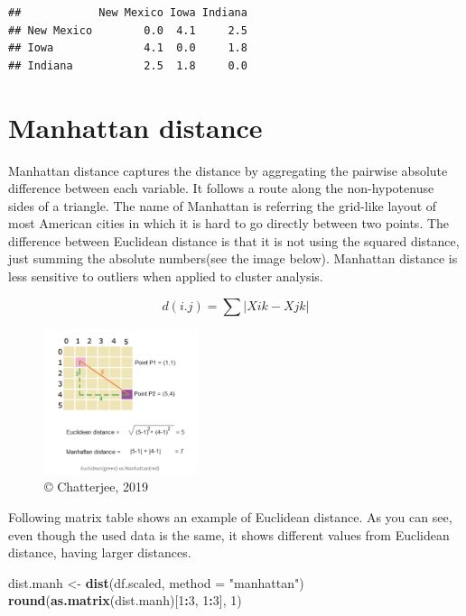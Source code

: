 \documentclass[]{book}
\newenvironment{Shaded}{\begin{snugshade}}{\end{snugshade}}
\newcommand{\DataTypeTok}[1]{\textcolor[rgb]{0.13,0.29,0.53}{#1}}
\newcommand{\DecValTok}[1]{\textcolor[rgb]{0.00,0.00,0.81}{#1}}
\newcommand{\KeywordTok}[1]{\textcolor[rgb]{0.13,0.29,0.53}{\textbf{#1}}}
\newcommand{\NormalTok}[1]{#1}
\newcommand{\OperatorTok}[1]{\textcolor[rgb]{0.81,0.36,0.00}{\textbf{#1}}}
\newcommand{\StringTok}[1]{\textcolor[rgb]{0.31,0.60,0.02}{#1}}
\begin{document}
\begin{verbatim}
##            New Mexico Iowa Indiana
## New Mexico        0.0  4.1     2.5
## Iowa              4.1  0.0     1.8
## Indiana           2.5  1.8     0.0
\end{verbatim}

\hypertarget{manhattan-distance}{%
\section{Manhattan distance}\label{manhattan-distance}}

Manhattan distance captures the distance by aggregating the pairwise absolute difference between each variable. It follows a route along the non-hypotenuse sides of a triangle. The name of Manhattan is referring the grid-like layout of most American cities in which it is hard to go directly between two points. The difference between Euclidean distance is that it is not using the squared distance, just summing the absolute numbers(see the image below). Manhattan distance is less sensitive to outliers when applied to cluster analysis.

\[
d(i.j) = \sum|Xik-Xjk|
\]

\begin{figure}
\centering
\includegraphics[width=0.4\textwidth,height=\textheight]{Manhattan.png}
\caption{© Chatterjee, 2019}
\end{figure}

Following matrix table shows an example of Euclidean distance. As you can see, even though the used data is the same, it shows different values from Euclidean distance, having larger distances.

\begin{Shaded}
\begin{Highlighting}[]
\NormalTok{dist.manh <-}\StringTok{ }\KeywordTok{dist}\NormalTok{(df.scaled, }\DataTypeTok{method =} \StringTok{"manhattan"}\NormalTok{)}
\KeywordTok{round}\NormalTok{(}\KeywordTok{as.matrix}\NormalTok{(dist.manh)[}\DecValTok{1}\OperatorTok{:}\DecValTok{3}\NormalTok{, }\DecValTok{1}\OperatorTok{:}\DecValTok{3}\NormalTok{], }\DecValTok{1}\NormalTok{)}
\end{Highlighting}
\end{Shaded}
\end{document}
